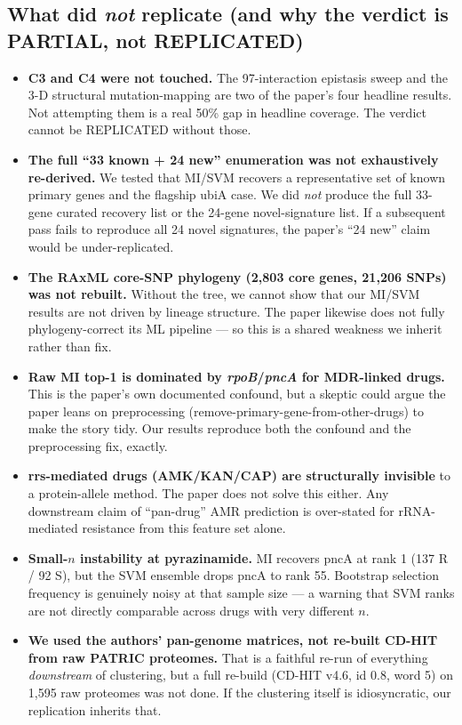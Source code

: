 \documentclass[11pt]{article}
\begin{document}
\subsection{What did \textit{not} replicate (and why the verdict is PARTIAL, not REPLICATED)}
\begin{itemize}
  \item \textbf{C3 and C4 were not touched.} The 97-interaction epistasis sweep and the 3-D structural mutation-mapping are two of the paper's four headline results. Not attempting them is a real 50\% gap in headline coverage. The verdict cannot be REPLICATED without those.
  \item \textbf{The full ``33 known + 24 new'' enumeration was not exhaustively re-derived.} We tested that MI/SVM recovers a representative set of known primary genes and the flagship ubiA case. We did \textit{not} produce the full 33-gene curated recovery list or the 24-gene novel-signature list. If a subsequent pass fails to reproduce all 24 novel signatures, the paper's ``24 new'' claim would be under-replicated.
  \item \textbf{The RAxML core-SNP phylogeny (2{,}803 core genes, 21{,}206 SNPs) was not rebuilt.} Without the tree, we cannot show that our MI/SVM results are not driven by lineage structure. The paper likewise does not fully phylogeny-correct its ML pipeline --- so this is a shared weakness we inherit rather than fix.
  \item \textbf{Raw MI top-1 is dominated by \textit{rpoB}/\textit{pncA} for MDR-linked drugs.} This is the paper's own documented confound, but a skeptic could argue the paper leans on preprocessing (remove-primary-gene-from-other-drugs) to make the story tidy. Our results reproduce both the confound and the preprocessing fix, exactly.
  \item \textbf{rrs-mediated drugs (AMK/KAN/CAP) are structurally invisible} to a protein-allele method. The paper does not solve this either. Any downstream claim of ``pan-drug'' AMR prediction is over-stated for rRNA-mediated resistance from this feature set alone.
  \item \textbf{Small-$n$ instability at pyrazinamide.} MI recovers pncA at rank 1 (137 R / 92 S), but the SVM ensemble drops pncA to rank 55. Bootstrap selection frequency is genuinely noisy at that sample size --- a warning that SVM ranks are not directly comparable across drugs with very different $n$.
  \item \textbf{We used the authors' pan-genome matrices, not re-built CD-HIT from raw PATRIC proteomes.} That is a faithful re-run of everything \textit{downstream} of clustering, but a full re-build (CD-HIT v4.6, id 0.8, word 5) on 1{,}595 raw proteomes was not done. If the clustering itself is idiosyncratic, our replication inherits that.
\end{itemize}
\end{document}
